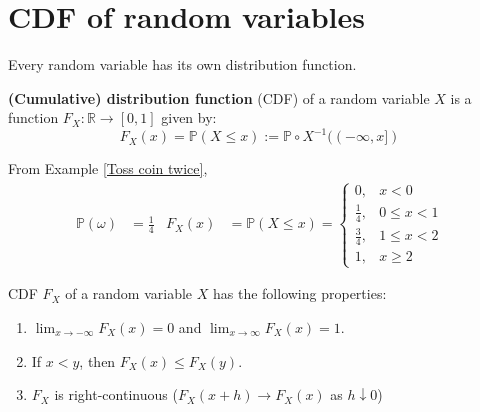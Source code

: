 \documentclass{huhtakm-template-book}
\newcommand{\prob}{\mathbb{P}}
\begin{document}
\section{CDF of random variables}
Every random variable has its own distribution function.
\begin{defn}
	\textbf{(Cumulative) distribution function} (CDF) of a random variable $X$ is a function $F_{X}:\mathbb{R}\to [0,1]$ given by:
	\begin{equation*}
		F_{X}(x)=\prob(X\leq x):=\prob\circ X^{-1}((-\infty,x])
	\end{equation*}
\end{defn}
\begin{eg}
	From Example \ref{Toss coin twice},
	\begin{align*}
		\prob(\omega)&=\frac{1}{4} & F_{X}(x)&=\prob(X\leq x)=\begin{cases}
			0, &x<0\\
			\frac{1}{4}, &0\leq x<1\\
			\frac{3}{4}, &1\leq x<2\\
			1, &x\geq 2
		\end{cases}
	\end{align*}
\end{eg}
\begin{lem}
	CDF $F_{X}$ of a random variable $X$ has the following properties:
	\begin{enumerate}
		\item $\lim_{x\to -\infty}F_{X}(x)=0$ and $\lim_{x\to\infty}F_{X}(x)=1$.
		\item If $x<y$, then $F_{X}(x)\leq F_{X}(y)$.
		\item $F_{X}$ is right-continuous ($F_{X}(x+h)\to F_{X}(x)$ as $h\downarrow 0$)
	\end{enumerate}
\end{lem}
\end{document}
